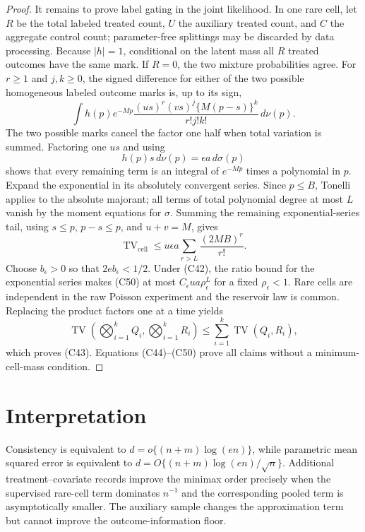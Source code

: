 \documentclass{article}
\begin{document}
\begin{proof}
It remains to prove label gating in the joint likelihood.  In one rare cell, let \(R\) be the total labeled treated count, \(U\) the auxiliary treated count, and \(C\) the aggregate control count; parameter-free splittings may be discarded by data processing.  Because \(|h|=1\), conditional on the latent mass all \(R\) treated outcomes have the same mark.  If \(R=0\), the two mixture probabilities agree.  For \(r\ge1\) and \(j,k\ge0\), the signed difference for either of the two possible homogeneous labeled outcome marks is, up to its sign,
\[
 \int h(p)e^{-Mp}\frac{(us)^r(vs)^j\{M(p-s)\}^k}{r!j!k!}\,d\nu(p). \tag{C48}
\]
The two possible marks cancel the factor one half when total variation is summed.  Factoring one \(us\) and using
\[
 h(p)s\,d\nu(p)=\epsilon a\,d\sigma(p)                             \tag{C49}
\]
shows that every remaining term is an integral of \(e^{-Mp}\) times a polynomial in \(p\).  Expand the exponential in its absolutely convergent series.  Since \(p\le B\), Tonelli applies to the absolute majorant; all terms of total polynomial degree at most \(L\) vanish by the moment equations for \(\sigma\).  Summing the remaining exponential-series tail, using \(s\le p\), \(p-s\le p\), and \(u+v=M\), gives
\[
 \operatorname{TV}_{\mathrm{cell}}
 \le u\epsilon a\sum_{r>L}\frac{(2MB)^r}{r!}.                     \tag{C50}
\]
Choose \(b_\epsilon>0\) so that \(2eb_\epsilon<1/2\).  Under (C42), the ratio bound for the exponential series makes (C50) at most \(C_\epsilon ua\rho_\epsilon^L\) for a fixed \(\rho_\epsilon<1\).  Rare cells are independent in the raw Poisson experiment and the reservoir law is common.  Replacing the product factors one at a time yields
\[
 \operatorname{TV}\!\left(\bigotimes_{i=1}^kQ_i,\bigotimes_{i=1}^kR_i\right)
 \le\sum_{i=1}^k\operatorname{TV}(Q_i,R_i),
\]
which proves (C43).  Equations (C44)--(C50) prove all claims without a minimum-cell-mass condition.
\end{proof}

\section{Interpretation}

Consistency is equivalent to \(d=o\{(n+m)\log(en)\}\), while parametric mean squared error is equivalent to \(d=O\{(n+m)\log(en)/\sqrt n\}\).  Additional treatment--covariate records improve the minimax order precisely when the supervised rare-cell term dominates \(n^{-1}\) and the corresponding pooled term is asymptotically smaller.  The auxiliary sample changes the approximation term but cannot improve the outcome-information floor.
\end{document}
